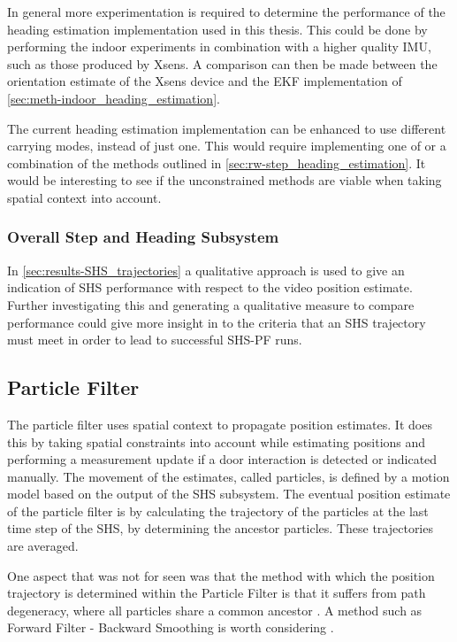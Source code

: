 In general more experimentation is required to determine the performance of the heading estimation implementation used in this thesis. This could be done by performing the indoor experiments in combination with a higher quality \ac{IMU}, such as those produced by Xsens. A comparison can then be made between the orientation estimate of the Xsens device and the EKF implementation of \cref{sec:meth-indoor_heading_estimation}.\par 

The current heading estimation implementation can be enhanced to use different carrying modes, instead of just one. This would require implementing one of or a combination of the methods outlined in \cref{sec:rw-step_heading_estimation}. It would be interesting to see if the unconstrained methods are viable when taking spatial context into account.


\subsubsection{Overall Step and Heading Subsystem }

In \cref{sec:results-SHS_trajectories} a qualitative approach is used to give an indication of SHS performance with respect to the video position estimate. Further investigating this and generating a qualitative measure to compare performance could give more insight in to the criteria that an SHS trajectory must meet in order to lead to successful SHS-PF runs.

\subsection*{Particle Filter}
The particle filter uses spatial context to propagate position estimates. It does this by taking spatial constraints into account while estimating positions and performing a measurement update if a door interaction is detected or indicated manually. The movement of the estimates, called particles, is defined by a motion model based on the output of the SHS subsystem. The eventual position estimate of the particle filter is by calculating the trajectory of the particles at the last time step of the SHS, by determining the ancestor particles. These trajectories are averaged.

One aspect that was not for seen was that the method with which the position trajectory is determined within the Particle Filter is that it suffers from path degeneracy, where all particles share a common ancestor \cite{Lindsten2013}. A method such as Forward Filter - Backward Smoothing is worth considering \cite{Lindsten2013}.

